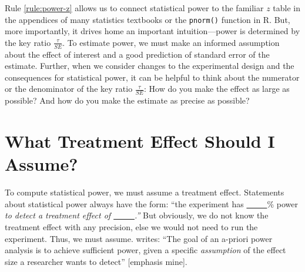 \documentclass[12pt]{article}
\begin{document}
\noindent Rule \ref{rule:power-z} allows us to connect statistical power to the familiar $z$ table in the appendices of many statistics textbooks or the \texttt{pnorm()} function in R.
But, more importantly, it drives home an important intuition---power is determined by the key ratio $\frac{\tau}{SE}$. 
To estimate power, we must make an informed assumption about the effect of interest and a good prediction of standard error of the estimate. 
Further, when we consider changes to the experimental design and the consequences for statistical power, it can be helpful to think about the numerator or the denominator of the key ratio $\frac{\tau}{SE}$: How do you make the effect as large as
possible? And how do you make the estimate as precise as possible?

\section*{What Treatment Effect Should I
Assume?}

To compute statistical power, we must assume a treatment effect. 
Statements about statistical power always have the form: ``the experiment has \underline{~~~~~}\% power \emph{to detect a treatment effect of \underline{~~~~~}.''} 
But obviously, we do not know the treatment effect with any precision, else we would not need to run the experiment. Thus, we must assume. 
\citet[6]{Lakens2022}  writes: ``The goal of an a-priori power analysis is to achieve sufficient power, given a specific \emph{assumption} of the effect size a researcher wants to detect'' [emphasis mine].
\end{document}
